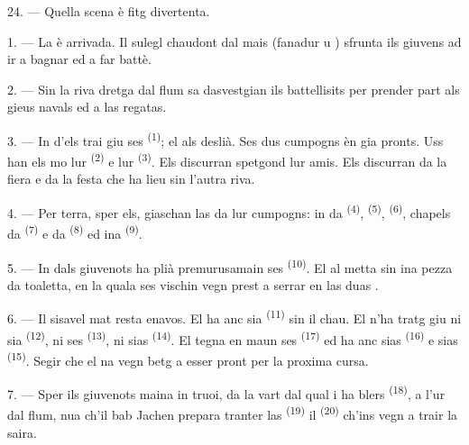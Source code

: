 24. --- Quella scena è fitg divertenta.

\VUsaut{4.0mm}
\VUsaut{3.0mm}

\VUsaut{2.4mm}

\VUsaut{3.0mm}

1. --- La  è arrivada. Il sulegl chaudont dal mais 
(fanadur u ) sfrunta ils giuvens ad ir a bagnar ed a far battè.

2. --- Sin la riva dretga dal flum sa dasvestgian ils battellisits per prender
part als gieus navals ed a las regatas.

3. --- In d'els trai giu ses  \textsuperscript{(1)}; el als
deslià. Ses dus cumpogns èn gia pronts. Uss han els mo lur  \textsuperscript{(2)} e lur  \textsuperscript{(3)}.
Els discurran spetgond lur amis. Els discurran da la fiera e da la festa che ha
lieu sin l'autra riva.

4. --- Per terra, sper els, giaschan las  da lur cumpogns: in
 da  \textsuperscript{(4)}, 
\textsuperscript{(5)},  \textsuperscript{(6)}, chapels da
 \textsuperscript{(7)} e da  \textsuperscript{(8)} ed ina
 \textsuperscript{(9)}.

5. --- In dals giuvenots ha plià premurusamain ses 
\textsuperscript{(10)}. El al metta sin ina pezza da toaletta, en la quala ses
vischin vegn prest a serrar en las duas .

6. --- Il sisavel mat resta enavos. El ha anc sia 
\textsuperscript{(11)} sin il chau. El n'ha tratg giu ni sia 
\textsuperscript{(12)}, ni ses  \textsuperscript{(13)}, ni sias
 \textsuperscript{(14)}. El tegna en maun ses 
\textsuperscript{(17)} ed ha anc sias  \textsuperscript{(16)} e
sias  \textsuperscript{(15)}. Segir che el na vegn betg a esser
pront per la proxima cursa.

7. --- Sper ils giuvenots maina in truoi, da la vart dal qual i ha blers
 \textsuperscript{(18)}, a l'ur dal flum, nua ch'il bab Jachen
prepara tranter las  \textsuperscript{(19)} il  \textsuperscript{(20)} ch'ins vegn a trair la saira.

